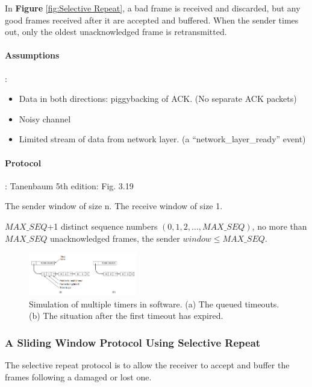 In \textbf{Figure} \ref{fig:Selective Repeat}, a bad frame is received and discarded, but any good frames received after it are accepted and buffered. When the sender times out, only the oldest unacknowledged frame is retransmitted.

\paragraph{Assumptions}:
\begin{itemize}
    \item Data in both directions: piggybacking of ACK. (No separate ACK packets)
    \item Noisy channel
    \item Limited stream of data from network layer. (a ``network\_layer\_ready'' event)
\end{itemize}

\paragraph{Protocol}: Tanenbaum 5th edition: Fig. 3.19 %

The sender window of size n. The receive window of size 1. 


$MAX\_SEQ$+1 distinct sequence numbers $(0, 1, 2, \dots, MAX\_SEQ)$, no more than $MAX\_SEQ$ unacknowledged frames, the sender $window\le MAX\_SEQ$. %

\begin{figure}[!htb]
    \centering
    \includegraphics[width=0.42\textwidth]{pic/CN3/Simulation of multiple timers in software}
    \caption{Simulation of multiple timers in software.  (a) The queued timeouts. (b) The situation after the first timeout has expired.}
\end{figure}

\subsubsection{A Sliding Window Protocol Using Selective Repeat}
The selective repeat protocol is to allow the receiver to accept and buffer the frames following a damaged or lost one. 

